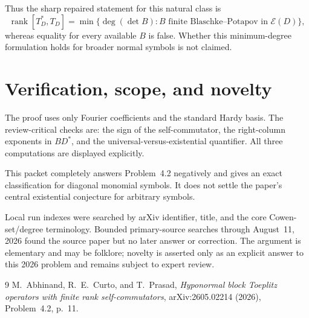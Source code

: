 \documentclass[11pt]{article}
\newcommand{\E}{\mathcal E}
\newcommand{\rank}{\operatorname{rank}}
\begin{document}
Thus the sharp repaired statement for this natural class is
\[
 \rank[T_D^*,T_D]
 =\min\{\deg(\det B):B\text{ finite Blaschke--Potapov in }\E(D)\},
\]
whereas equality for every available $B$ is false.  Whether this
minimum-degree formulation holds for broader normal symbols is not claimed.

\section{Verification, scope, and novelty}

The proof uses only Fourier coefficients and the standard Hardy basis.  The
review-critical checks are: the sign of the self-commutator, the right-column
exponents in $BD^*$, and the universal-versus-existential quantifier.  All
three computations are displayed explicitly.

This packet completely answers Problem~4.2 negatively and gives an exact
classification for diagonal monomial symbols.  It does not settle the
paper's central existential conjecture for arbitrary symbols.

Local run indexes were searched by arXiv identifier, title, and the core
Cowen-set/degree terminology.  Bounded primary-source searches through
August~11, 2026 found the source paper but no later answer or correction.
The argument is elementary and may be folklore; novelty is asserted only as
an explicit answer to this 2026 problem and remains subject to expert review.

\begin{thebibliography}{9}
M.~Abhinand, R.~E.~Curto, and T.~Prasad,
\emph{Hyponormal block Toeplitz operators with finite rank self-commutators},
arXiv:2605.02214 (2026), Problem~4.2, p.~11.
\end{thebibliography}
\end{document}
